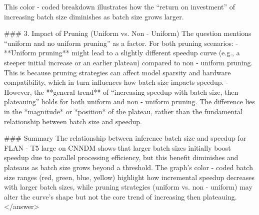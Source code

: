 This color - coded breakdown illustrates how the “return on investment” of increasing batch size diminishes as batch size grows larger.  


### 3. Impact of Pruning (Uniform vs. Non - Uniform)  
The question mentions “uniform and no uniform pruning” as a factor. For both pruning scenarios:  
- **Uniform pruning** might lead to a slightly different speedup curve (e.g., a steeper initial increase or an earlier plateau) compared to non - uniform pruning. This is because pruning strategies can affect model sparsity and hardware compatibility, which in turn influences how batch size impacts speedup.  
- However, the **general trend** of “increasing speedup with batch size, then plateauing” holds for both uniform and non - uniform pruning. The difference lies in the *magnitude* or *position* of the plateau, rather than the fundamental relationship between batch size and speedup.  


### Summary  
The relationship between inference batch size and speedup for FLAN - T5 large on CNNDM shows that larger batch sizes initially boost speedup due to parallel processing efficiency, but this benefit diminishes and plateaus as batch size grows beyond a threshold. The graph’s color - coded batch size ranges (red, green, blue, yellow) highlight how incremental speedup decreases with larger batch sizes, while pruning strategies (uniform vs. non - uniform) may alter the curve’s shape but not the core trend of increasing then plateauing.</answer>